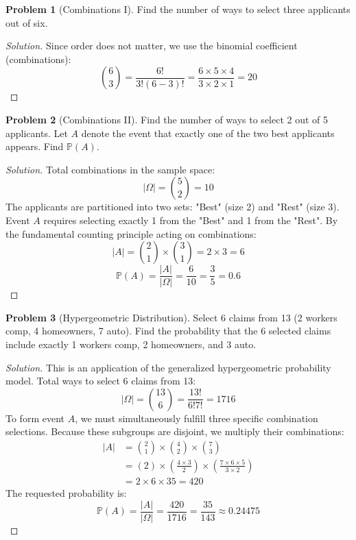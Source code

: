 \documentclass[11pt, letterpaper]{article}
\theoremstyle{definition}
\newtheorem{example}{Problem}
\theoremstyle{remark}
\newcommand{\Prob}{\mathbb{P}}
\begin{document}
\begin{example}[Combinations I]
    Find the number of ways to select three applicants out of six.
\end{example}
\begin{proof}[Solution]
    Since order does not matter, we use the binomial coefficient (combinations):
    \[ \binom{6}{3} = \frac{6!}{3!(6-3)!} = \frac{6 \times 5 \times 4}{3 \times 2 \times 1} = 20 \]
\end{proof}

\begin{example}[Combinations II]
    Find the number of ways to select 2 out of 5 applicants. Let $A$ denote the event that exactly one of the two best applicants appears. Find $\Prob(A)$.
\end{example}
\begin{proof}[Solution]
    Total combinations in the sample space:
    \[ |\Omega| = \binom{5}{2} = 10 \]
    The applicants are partitioned into two sets: "Best" (size 2) and "Rest" (size 3).
    Event $A$ requires selecting exactly 1 from the "Best" and 1 from the "Rest". By the fundamental counting principle acting on combinations:
    \[ |A| = \binom{2}{1} \times \binom{3}{1} = 2 \times 3 = 6 \]
    \[ \Prob(A) = \frac{|A|}{|\Omega|} = \frac{6}{10} = \frac{3}{5} = 0.6 \]
\end{proof}

\begin{example}[Hypergeometric Distribution]
    Select 6 claims from 13 (2 workers comp, 4 homeowners, 7 auto). Find the probability that the 6 selected claims include exactly 1 workers comp, 2 homeowners, and 3 auto.
\end{example}
\begin{proof}[Solution]
    This is an application of the generalized hypergeometric probability model. 
    Total ways to select 6 claims from 13:
    \[ |\Omega| = \binom{13}{6} = \frac{13!}{6!7!} = 1716 \]
    To form event $A$, we must simultaneously fulfill three specific combination selections. Because these subgroups are disjoint, we multiply their combinations:
    \begin{align*}
        |A| &= \binom{2}{1} \times \binom{4}{2} \times \binom{7}{3} \\
        &= (2) \times \left( \frac{4 \times 3}{2} \right) \times \left( \frac{7 \times 6 \times 5}{3 \times 2} \right) \\
        &= 2 \times 6 \times 35 = 420
    \end{align*}
    The requested probability is:
    \[ \Prob(A) = \frac{|A|}{|\Omega|} = \frac{420}{1716} = \frac{35}{143} \approx 0.24475 \]
\end{proof}
\end{document}
